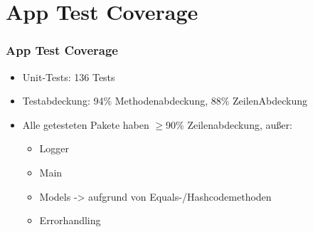 \section*{App Test Coverage}

\begin{frame}\frametitle{App Test Coverage}
    \begin{itemize}
        \item Unit-Tests: 136 Tests
        \item Testabdeckung: 94\% Methodenabdeckung, 88\% ZeilenAbdeckung
        \item Alle getesteten Pakete haben $\geq$90\% Zeilenabdeckung, außer: 
        \begin{itemize}
            \item Logger
            \item Main
            \item Models -> aufgrund von Equals-/Hashcodemethoden 
            \item Errorhandling
        \end{itemize}
    \end{itemize}
\end{frame}